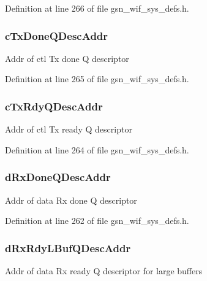 Definition at line 266 of file gsn\_\-wif\_\-sys\_\-defs.h.

\hypertarget{a00348_a78a51b81650e81f8eadc7c11f49dcf0b}{
\subsubsection[{cTxDoneQDescAddr}]{ {\bf cTxDoneQDescAddr}}}
\label{a00348_a78a51b81650e81f8eadc7c11f49dcf0b}
Addr of ctl Tx done Q descriptor 

Definition at line 265 of file gsn\_\-wif\_\-sys\_\-defs.h.

\hypertarget{a00348_a1542d73344b14a84e7f710c4de9bb8a7}{
\subsubsection[{cTxRdyQDescAddr}]{ {\bf cTxRdyQDescAddr}}}
\label{a00348_a1542d73344b14a84e7f710c4de9bb8a7}
Addr of ctl Tx ready Q descriptor 

Definition at line 264 of file gsn\_\-wif\_\-sys\_\-defs.h.

\hypertarget{a00348_ab8fef41094b77d4a751980b345341c36}{
\subsubsection[{dRxDoneQDescAddr}]{ {\bf dRxDoneQDescAddr}}}
\label{a00348_ab8fef41094b77d4a751980b345341c36}
Addr of data Rx done Q descriptor 

Definition at line 262 of file gsn\_\-wif\_\-sys\_\-defs.h.

\hypertarget{a00348_a26310480a4f804ddac47c8036ed576a0}{
\subsubsection[{dRxRdyLBufQDescAddr}]{ {\bf dRxRdyLBufQDescAddr}}}
\label{a00348_a26310480a4f804ddac47c8036ed576a0}
Addr of data Rx ready Q descriptor for large buffers 

